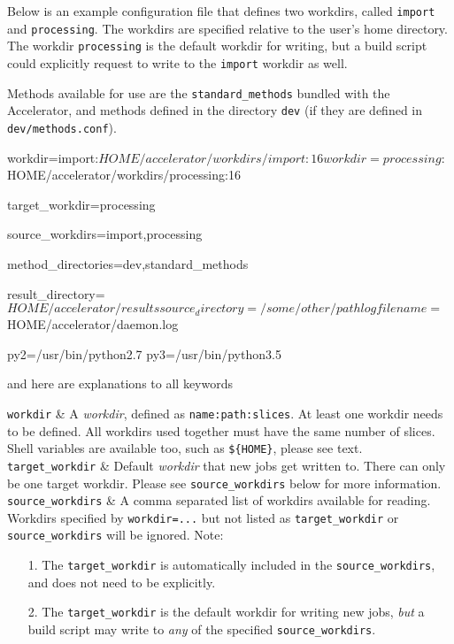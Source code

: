 Below is an example configuration file that defines two workdirs,
called \texttt{import} and
\texttt{processing}.  The workdirs are specified relative to the user's
home directory.  The workdir \texttt{processing} is the default workdir
for writing, but a build script could explicitly request to write to
the \texttt{import} workdir as well.

Methods available for use are the \texttt{standard\_methods} bundled
with the Accelerator, and methods defined in the
directory \texttt{dev} (if they are defined in \texttt{dev/methods.conf}).
\begin{leftbar}
\begin{shell}
workdir=import:${HOME}/accelerator/workdirs/import:16
workdir=processing:${HOME}/accelerator/workdirs/processing:16

target_workdir=processing

source_workdirs=import,processing

method_directories=dev,standard_methods

result_directory=${HOME}/accelerator/results

source_directory=/some/other/path

logfilename=${HOME}/accelerator/daemon.log

py2=/usr/bin/python2.7
py3=/usr/bin/python3.5
\end{shell}
\end{leftbar}
\noindent and here are explanations to all keywords
\starttabletwo

\RPtwo \texttt{workdir} & A \textsl{workdir}, defined as
\texttt{name:path:slices}.  At least one workdir needs to be defined.
All workdirs used together must have the same number of slices.  Shell
variables are available too, such as \texttt{\$\{HOME\}}, please see
text.\\[1ex]

\RPtwo \texttt{target\_workdir} & Default \textsl{workdir}
that new jobs get written to.  There can only be one target workdir.
Please see \texttt{source\_workdirs} below for more
information.\\[1ex]

\RPtwo \texttt{source\_workdirs} & A comma separated list of workdirs
available for reading.  Workdirs specified by \texttt{workdir=...}
but not listed as \texttt{target\_workdir}
or \texttt{source\_workdirs} will be ignored.  Note:
\begin{itemize}
  \item[1.] The \texttt{target\_workdir} is automatically included in
    the \texttt{source\_workdirs}, and does not need to be
    explicitly.
  \item[2.] The \texttt{target\_workdir} is the default
    workdir for writing new jobs, \textsl{but} a build script may write
    to \textsl{any} of the specified \texttt{source\_workdirs}.
\end{itemize}\\[1ex]

